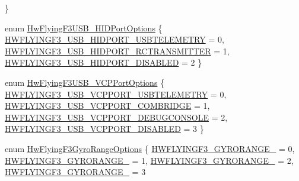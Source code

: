 \begin{DoxyCompactItemize}
 \}
\item 
enum \hyperlink{group___hw_flying_f3_ga5388e7ade12f23908ba88f10b68a9a28}{\-Hw\-Flying\-F3\-U\-S\-B\-\_\-\-H\-I\-D\-Port\-Options} \{ \hyperlink{group___hw_flying_f3_gga5388e7ade12f23908ba88f10b68a9a28a040c27937a0bca5f7711dfea7fd00f62}{\-H\-W\-F\-L\-Y\-I\-N\-G\-F3\-\_\-\-U\-S\-B\-\_\-\-H\-I\-D\-P\-O\-R\-T\-\_\-\-U\-S\-B\-T\-E\-L\-E\-M\-E\-T\-R\-Y} = 0, 
\hyperlink{group___hw_flying_f3_gga5388e7ade12f23908ba88f10b68a9a28a812da0f1ddcd88fa30c28ff7f6d0d006}{\-H\-W\-F\-L\-Y\-I\-N\-G\-F3\-\_\-\-U\-S\-B\-\_\-\-H\-I\-D\-P\-O\-R\-T\-\_\-\-R\-C\-T\-R\-A\-N\-S\-M\-I\-T\-T\-E\-R} = 1, 
\hyperlink{group___hw_flying_f3_gga5388e7ade12f23908ba88f10b68a9a28a6fd2ef62c422fdc8c2950f9a94b677b8}{\-H\-W\-F\-L\-Y\-I\-N\-G\-F3\-\_\-\-U\-S\-B\-\_\-\-H\-I\-D\-P\-O\-R\-T\-\_\-\-D\-I\-S\-A\-B\-L\-E\-D} = 2
 \}
\item 
enum \hyperlink{group___hw_flying_f3_ga93359c3f7f800fcf06bd67e6a89c47b4}{\-Hw\-Flying\-F3\-U\-S\-B\-\_\-\-V\-C\-P\-Port\-Options} \{ \hyperlink{group___hw_flying_f3_gga93359c3f7f800fcf06bd67e6a89c47b4afa2d0a66a5299775f1134dc7d4529bbe}{\-H\-W\-F\-L\-Y\-I\-N\-G\-F3\-\_\-\-U\-S\-B\-\_\-\-V\-C\-P\-P\-O\-R\-T\-\_\-\-U\-S\-B\-T\-E\-L\-E\-M\-E\-T\-R\-Y} = 0, 
\hyperlink{group___hw_flying_f3_gga93359c3f7f800fcf06bd67e6a89c47b4a8c417b09a8145c6f2388c30280712f70}{\-H\-W\-F\-L\-Y\-I\-N\-G\-F3\-\_\-\-U\-S\-B\-\_\-\-V\-C\-P\-P\-O\-R\-T\-\_\-\-C\-O\-M\-B\-R\-I\-D\-G\-E} = 1, 
\hyperlink{group___hw_flying_f3_gga93359c3f7f800fcf06bd67e6a89c47b4a676ff80f73426b65f718340a9c486441}{\-H\-W\-F\-L\-Y\-I\-N\-G\-F3\-\_\-\-U\-S\-B\-\_\-\-V\-C\-P\-P\-O\-R\-T\-\_\-\-D\-E\-B\-U\-G\-C\-O\-N\-S\-O\-L\-E} = 2, 
\hyperlink{group___hw_flying_f3_gga93359c3f7f800fcf06bd67e6a89c47b4a73279b749acf1dd4366ff535e751928f}{\-H\-W\-F\-L\-Y\-I\-N\-G\-F3\-\_\-\-U\-S\-B\-\_\-\-V\-C\-P\-P\-O\-R\-T\-\_\-\-D\-I\-S\-A\-B\-L\-E\-D} = 3
 \}
\item 
enum \hyperlink{group___hw_flying_f3_ga20c902e95549d85be1c0a76c37e97ca2}{\-Hw\-Flying\-F3\-Gyro\-Range\-Options} \{ \hyperlink{group___hw_flying_f3_gga20c902e95549d85be1c0a76c37e97ca2ab4289af038f45193f9755531e3f1a724}{\-H\-W\-F\-L\-Y\-I\-N\-G\-F3\-\_\-\-G\-Y\-R\-O\-R\-A\-N\-G\-E\-\_} = 0, 
\hyperlink{group___hw_flying_f3_gga20c902e95549d85be1c0a76c37e97ca2a6429aa69dca65194db9de4bf0b76f167}{\-H\-W\-F\-L\-Y\-I\-N\-G\-F3\-\_\-\-G\-Y\-R\-O\-R\-A\-N\-G\-E\-\_} = 1, 
\hyperlink{group___hw_flying_f3_gga20c902e95549d85be1c0a76c37e97ca2a3296e7bb82b51ddd2bfcef37ead8a7e4}{\-H\-W\-F\-L\-Y\-I\-N\-G\-F3\-\_\-\-G\-Y\-R\-O\-R\-A\-N\-G\-E\-\_} = 2, 
\hyperlink{group___hw_flying_f3_gga20c902e95549d85be1c0a76c37e97ca2aa5d14be430f8b11ecc2b561595f3a08a}{\-H\-W\-F\-L\-Y\-I\-N\-G\-F3\-\_\-\-G\-Y\-R\-O\-R\-A\-N\-G\-E\-\_} = 3

\end{DoxyCompactItemize}

